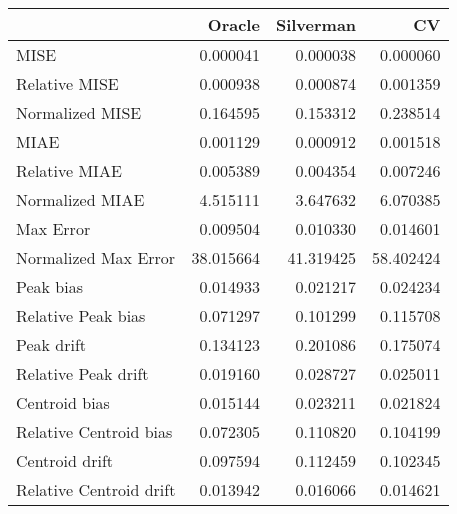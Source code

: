 \begin{tabular}{lrrr}
  \hline
 & Oracle & Silverman & CV \\ 
  \hline
MISE & 0.000041 & 0.000038 & 0.000060 \\ 
  Relative MISE & 0.000938 & 0.000874 & 0.001359 \\ 
  Normalized MISE & 0.164595 & 0.153312 & 0.238514 \\ 
  MIAE & 0.001129 & 0.000912 & 0.001518 \\ 
  Relative MIAE & 0.005389 & 0.004354 & 0.007246 \\ 
  Normalized MIAE & 4.515111 & 3.647632 & 6.070385 \\ 
  Max Error & 0.009504 & 0.010330 & 0.014601 \\ 
  Normalized Max Error & 38.015664 & 41.319425 & 58.402424 \\ 
  Peak bias & 0.014933 & 0.021217 & 0.024234 \\ 
  Relative Peak bias & 0.071297 & 0.101299 & 0.115708 \\ 
  Peak drift & 0.134123 & 0.201086 & 0.175074 \\ 
  Relative Peak drift & 0.019160 & 0.028727 & 0.025011 \\ 
  Centroid bias & 0.015144 & 0.023211 & 0.021824 \\ 
  Relative Centroid bias & 0.072305 & 0.110820 & 0.104199 \\ 
  Centroid drift & 0.097594 & 0.112459 & 0.102345 \\ 
  Relative Centroid drift & 0.013942 & 0.016066 & 0.014621 \\ 
   \hline
\end{tabular}
